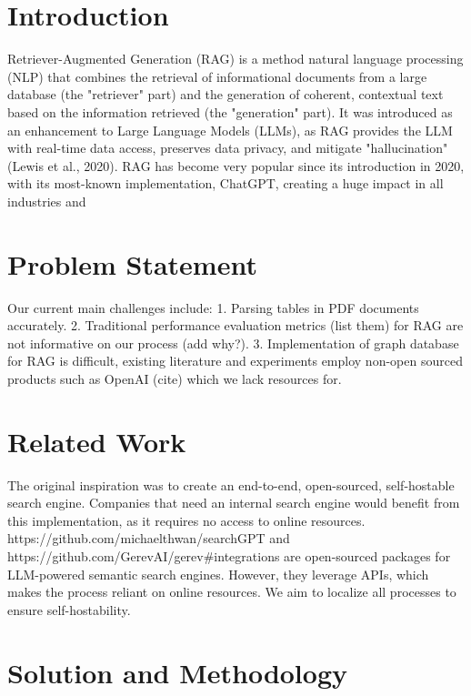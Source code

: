 \documentclass{scrartcl}
\begin{document}
\section{Introduction}
Retriever-Augmented Generation (RAG) is a method natural language processing (NLP) that combines the retrieval of informational documents from a large database (the "retriever" part) and the generation of coherent, contextual text based on the information retrieved (the "generation" part). 
It was introduced as an enhancement to Large Language Models (LLMs), as RAG provides the LLM with real-time data access, preserves data privacy, and mitigate "hallucination" (Lewis et al., 2020).
RAG has become very popular since its introduction in 2020, with its most-known implementation, ChatGPT, creating a huge impact in all industries and

\section{Problem Statement}
Our current main challenges include:
1. Parsing tables in PDF documents accurately.
2. Traditional performance evaluation metrics (list them) for RAG are not informative on our process (add why?). 
3. Implementation of graph database for RAG is difficult, existing literature and experiments employ non-open sourced products such as OpenAI (cite) which we lack resources for.


\section{Related Work}
The original inspiration was to create an end-to-end, open-sourced, self-hostable search engine. Companies that need an internal search engine would benefit from this implementation, as it requires no access to online resources.
https://github.com/michaelthwan/searchGPT and https://github.com/GerevAI/gerev#integrations are open-sourced packages for LLM-powered semantic search engines. However, they leverage APIs, which makes the process reliant on online resources. We aim to localize all processes to ensure self-hostability.
\section{Solution and Methodology}
\end{document}
